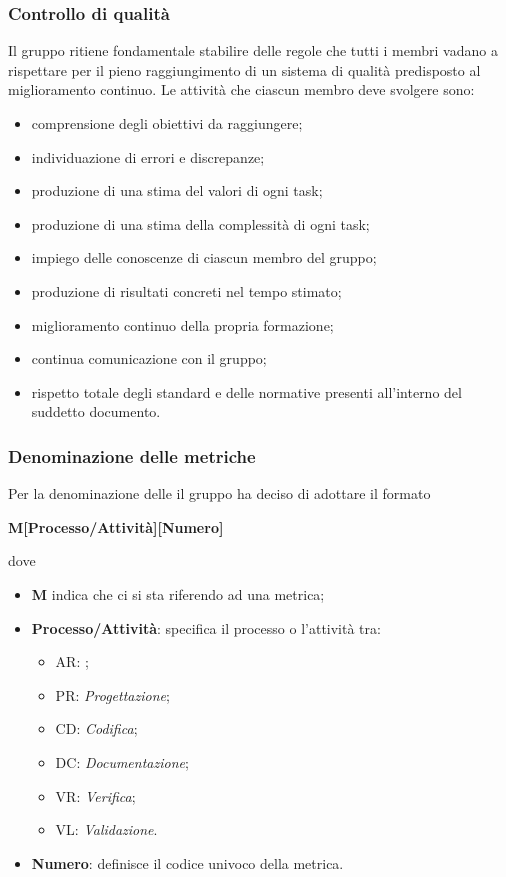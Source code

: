 \subsubsection{Controllo di qualità}
Il gruppo \textit{\Gruppo{}} ritiene fondamentale stabilire delle regole che tutti i membri vadano a rispettare per il pieno raggiungimento di un sistema di qualità predisposto al miglioramento continuo.
Le attività che ciascun membro deve svolgere sono:
\begin{itemize}
	\item comprensione degli obiettivi da raggiungere;
	\item individuazione di errori e discrepanze;
	\item produzione di una stima del valori di ogni task;
	\item produzione di una stima della complessità di ogni task;
	\item impiego delle conoscenze di ciascun membro del gruppo;
	\item produzione di risultati concreti nel tempo stimato;
	\item miglioramento continuo della propria formazione;
	\item continua comunicazione con il gruppo;
	\item rispetto totale degli standard e delle normative presenti all'interno del suddetto documento.
\end{itemize} 
\subsubsection{Denominazione delle metriche}
Per la denominazione delle  il gruppo ha deciso di adottare il formato\newline \centerline{\textbf{M[Processo/Attività][Numero]}}\newline
dove
\begin{itemize}
	\item \textbf{M} indica che ci si sta riferendo ad una metrica;
	\item \textbf{Processo/Attività}: specifica il processo o l'attività tra:
	\begin{itemize}
		\item AR: \AdR{};
		\item PR: \emph{Progettazione};
		\item CD: \emph{Codifica};
		\item DC: \emph{Documentazione};
		\item VR: \emph{Verifica};
		\item VL: \emph{Validazione}.
	\end{itemize}
	\item \textbf{Numero}: definisce il codice univoco della metrica.
\end{itemize}
